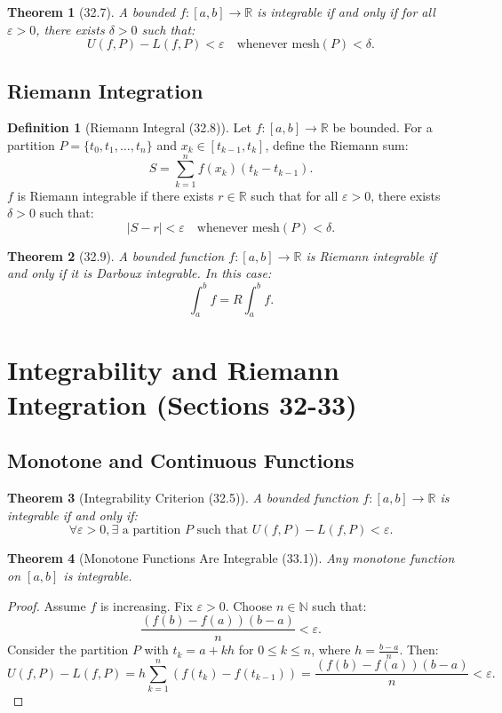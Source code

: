 \documentclass[9pt]{article}
\theoremstyle{definition}
\newtheorem{definition}{Definition}
\theoremstyle{plain}
\newtheorem{theorem}{Theorem}
\begin{document}
\begin{theorem}[32.7]
A bounded \( f : [a, b] \to \mathbb{R} \) is integrable if and only if for all \( \varepsilon > 0 \), there exists \( \delta > 0 \) such that:
\[
U(f, P) - L(f, P) < \varepsilon \quad \text{whenever mesh}(P) < \delta.
\]
\end{theorem}

\subsection*{Riemann Integration}
\begin{definition}[Riemann Integral (32.8)]
Let \( f : [a, b] \to \mathbb{R} \) be bounded. For a partition \( P = \{t_0, t_1, \ldots, t_n\} \) and \( x_k \in [t_{k-1}, t_k] \), define the Riemann sum:
\[
S = \sum_{k=1}^n f(x_k)(t_k - t_{k-1}).
\]
\( f \) is Riemann integrable if there exists \( r \in \mathbb{R} \) such that for all \( \varepsilon > 0 \), there exists \( \delta > 0 \) such that:
\[
|S - r| < \varepsilon \quad \text{whenever mesh}(P) < \delta.
\]
\end{definition}

\begin{theorem}[32.9]
A bounded function \( f : [a, b] \to \mathbb{R} \) is Riemann integrable if and only if it is Darboux integrable. In this case:
\[
\int_a^b f = R\int_a^b f.
\]
\end{theorem}
\section*{Integrability and Riemann Integration (Sections 32-33)}

\subsection*{Monotone and Continuous Functions}
\begin{theorem}[Integrability Criterion (32.5)]
A bounded function \( f : [a, b] \to \mathbb{R} \) is integrable if and only if:
\[
\forall \varepsilon > 0, \exists \text{ a partition } P \text{ such that } U(f, P) - L(f, P) < \varepsilon.
\]
\end{theorem}

\begin{theorem}[Monotone Functions Are Integrable (33.1)]
Any monotone function on \( [a, b] \) is integrable.
\end{theorem}

\begin{proof}
Assume \( f \) is increasing. Fix \( \varepsilon > 0 \). Choose \( n \in \mathbb{N} \) such that:
\[
\frac{(f(b) - f(a))(b - a)}{n} < \varepsilon.
\]
Consider the partition \( P \) with \( t_k = a + kh \) for \( 0 \leq k \leq n \), where \( h = \frac{b-a}{n} \). Then:
\[
U(f, P) - L(f, P) = h \sum_{k=1}^n (f(t_k) - f(t_{k-1})) = \frac{(f(b) - f(a))(b - a)}{n} < \varepsilon.
\]
\end{proof}
\end{document}
